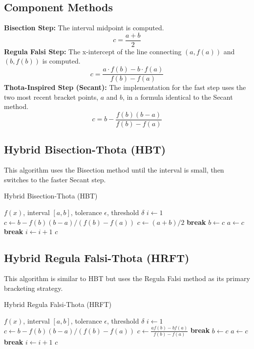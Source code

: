 \documentclass[reprint, amsmath, amssymb, aps, prl]{revtex4-2}
\begin{document}
\subsection{Component Methods}
\textbf{Bisection Step:} The interval midpoint is computed. 
$$c = \frac{a+b}{2}$$
\textbf{Regula Falsi Step:} The x-intercept of the line connecting $(a, f(a))$ and $(b, f(b))$ is computed.
$$c = \frac{a \cdot f(b) - b \cdot f(a)}{f(b) - f(a)}$$
\textbf{Thota-Inspired Step (Secant):} The implementation for the fast step uses the two most recent bracket points, $a$ and $b$, in a formula identical to the Secant method.
$$c = b - \frac{f(b)(b-a)}{f(b)-f(a)}$$

\subsection{Hybrid Bisection-Thota (HBT)}
This algorithm uses the Bisection method until the interval is small, then switches to the faster Secant step.

\begin{algorithm}[H]
\caption{Hybrid Bisection-Thota (HBT)}
\label{alg:hbt}
\begin{algorithmic}[1]
\Require $f(x)$, interval $[a, b]$, tolerance $\epsilon$, threshold $\delta$
\State $i \leftarrow 1$
\Loop
        \State $c \leftarrow b - f(b)(b-a) / (f(b)-f(a))$ 
    \Else
        \State $c \leftarrow (a+b)/2$ 
    \EndIf
        \State \textbf{break}
    \EndIf
        \State $b \leftarrow c$
    \Else
        \State $a \leftarrow c$
    \EndIf
        \State \textbf{break}
    \EndIf
    \State $i \leftarrow i + 1$
\EndLoop
\State \Return $c$
\end{algorithmic}
\end{algorithm}

\subsection{Hybrid Regula Falsi-Thota (HRFT)}
This algorithm is similar to HBT but uses the Regula Falsi method as its primary bracketing strategy.

\begin{algorithm}[H]
\caption{Hybrid Regula Falsi-Thota (HRFT)}
\label{alg:hrft}
\begin{algorithmic}[1]
\Require $f(x)$, interval $[a, b]$, tolerance $\epsilon$, threshold $\delta$
\State $i \leftarrow 1$
\Loop
        \State $c \leftarrow b - f(b)(b-a) / (f(b)-f(a))$ 
    \Else
        \State $c \leftarrow \frac{a f(b) - b f(a)}{f(b) - f(a)}$ 
    \EndIf
        \State \textbf{break}
    \EndIf
        \State $b \leftarrow c$
    \Else
        \State $a \leftarrow c$
    \EndIf
        \State \textbf{break}
    \EndIf
    \State $i \leftarrow i + 1$
\EndLoop
\State \Return $c$
\end{algorithmic}
\end{algorithm}
\end{document}
